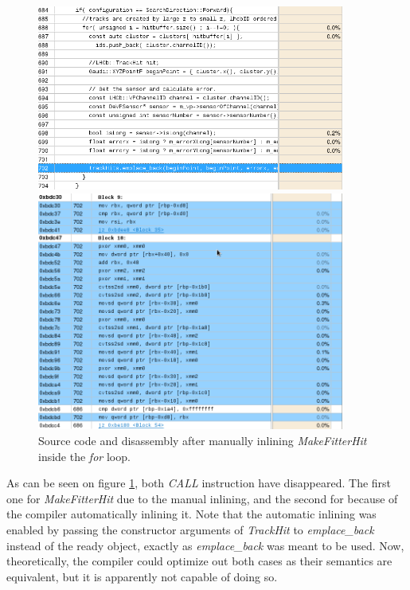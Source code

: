 \documentclass[12pt]{article}
\begin{document}
\begin{figure}[H]
	\begin{center}
		\includegraphics[width=0.9\textwidth]{kalmanfit_disasm_opt_src_inlined}
	\end{center}
	\begin{center}
		\includegraphics[width=0.9\textwidth]{kalmanfit_disasm_opt_asm_inlined}
	\end{center}
	\caption{Source code and disassembly after manually inlining \textit{MakeFitterHit} inside the \textit{for} loop.}
	\label{fig_kalman_disasm_src_inlined}
\end{figure}

As can be seen on figure \ref{fig_kalman_disasm_src_inlined}, both \textit{CALL} instruction have disappeared. The first one for \textit{MakeFitterHit} due to the manual inlining, and the second for  because of the compiler automatically inlining it. Note that the automatic inlining was enabled by passing the constructor arguments of \textit{TrackHit} to \textit{emplace\_back} instead of the ready object, exactly as \textit{emplace\_back} was meant to be used. Now, theoretically, the compiler could optimize out both cases as their semantics are equivalent, but it is apparently not capable of doing so.
\end{document}
